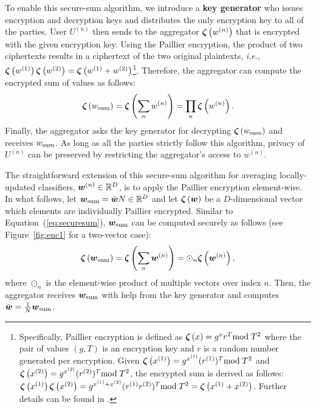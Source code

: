 \documentclass[10pt,twocolumn,letterpaper]{article}
\def\sub#1{_{\rm #1}}
\def\vct#1{\mbox{\boldmath $#1$}}
\def\ie{{\it i.e.}}
\def\ui#1{^{(#1)}}
\def\he#1{\vct{\zeta}\left(#1\right)}
\begin{document}
To enable this secure-sum algorithm, we introduce a {\bf key generator} who issues encryption and decryption keys and distributes the only encryption key to all of the parties. User $U\ui{n}$ then sends to the aggregator $\he{w\ui{n}}$ that is encrypted with the given encryption key. Using the Paillier encryption, the product of two ciphertexts results in a ciphertext of the two original plaintexts, \ie, $\he{w\ui{1}}\he{w\ui{2}}= \he{w\ui{1}+w\ui{2}}$\footnote{Specifically, Paillier encryption is defined as $\he{x}=g^xr^T {\rm mod}\; T^2$ where the pair of values $(g, T)$ is an encryption key and $r$ is a random number generated per encryption. Given $\he{x\ui{1}}=g^{x\ui{1}}(r\ui{1})^T {\rm mod}\; T^2$ and $\he{x\ui{2}}=g^{x\ui{2}}(r\ui{2})^T {\rm mod}\; T^2$, the encrypted sum is derived as follows: $\he{x\ui{1}}\he{x\ui{2}} = g^{x\ui{1}+x\ui{2}}(r\ui{1}r\ui{2})^T {\rm mod}\; T^2=\he{x\ui{1}+x\ui{2}}$. Further details can be found in \cite{Fontaine2007a, Paillier1999a}.}. Therefore, the aggregator can compute the encrypted sum of values as follows:
\begin{equation}
\he{w\sub{sum}} = \he{\sum_n w\ui{n}} = \prod_n\he{w\ui{n}}.
\label{eq:securesum}
\end{equation}
Finally, the aggregator asks the key generator for decrypting $\he{w\sub{sum}}$ and receives $w\sub{sum}$. As long as all the parties strictly follow this algorithm, privacy of $U\ui{n}$ can be preserved by restricting the aggregator's access to $w\ui{n}$.

The straightforward extension of this secure-sum algorithm for averaging locally-updated classifiers, $\vct{w}\ui{n}\in\mathbb{R}^D$, is to apply the Paillier encryption element-wise. In what follows, let $\vct{w}\sub{sum}=\bar{\vct{w}}N\in\mathbb{R}^D$ and let $\he{\vct{w}}$ be a $D$-dimensional vector which elements are individually Paillier encrypted. Similar to Equation~(\ref{eq:securesum}), $\vct{w}\sub{sum}$ can be computed securely as follows (see Figure~\ref{fig:enc1} for a two-vector case):
\begin{equation}
\he{\vct{w}\sub{sum}}=\he{\sum_n \vct{w}\ui{n}}=\odot_n\he{\vct{w}\ui{n}},
\label{eq:vecsum}
\end{equation}
where $\odot_n$ is the element-wise product of multiple vectors over index $n$. Then, the aggregator receives $\vct{w}\sub{sum}$ with help from the key generator and computes $\bar{\vct{w}} = \frac{1}{N}\vct{w}\sub{sum}$.
\end{document}
